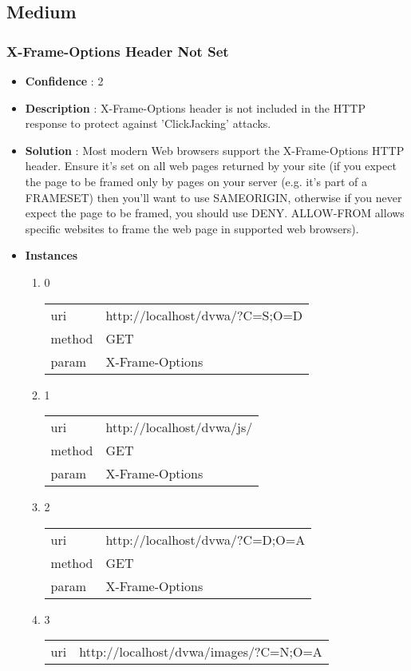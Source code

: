 \documentclass[10pt]{article}
\begin{document}
\subsection{Medium}
\subsubsection{X-Frame-Options Header Not Set}
\begin{itemize}
\item[] \textbf{Confidence} : 2
\item[] \textbf{Description} : X-Frame-Options header is not included in the HTTP response to protect against 'ClickJacking' attacks.
\item[] \textbf{Solution} :  Most modern Web browsers support the X-Frame-Options HTTP header. Ensure it's set on all web pages returned by your site (if you expect the page to be framed only by pages on your server (e.g. it's part of a FRAMESET) then you'll want to use SAMEORIGIN, otherwise if you never expect the page to be framed, you should use DENY. ALLOW-FROM allows specific websites to frame the web page in supported web browsers).
\item[] \textbf{Instances}
\begin{enumerate}
\item[] 0
\begin{tabular}{| l | p{12cm}}
uri & http://localhost/dvwa/?C=S;O=D \\
method & GET \\
param & X-Frame-Options \\
\end{tabular}
\item[] 1
\begin{tabular}{| l | p{12cm}}
uri & http://localhost/dvwa/js/ \\
method & GET \\
param & X-Frame-Options \\
\end{tabular}
\item[] 2
\begin{tabular}{| l | p{12cm}}
uri & http://localhost/dvwa/?C=D;O=A \\
method & GET \\
param & X-Frame-Options \\
\end{tabular}
\item[] 3
\begin{tabular}{| l | p{12cm}}
uri & http://localhost/dvwa/images/?C=N;O=A \\

\end{tabular}
\end{enumerate}
\end{itemize}
\end{document}
